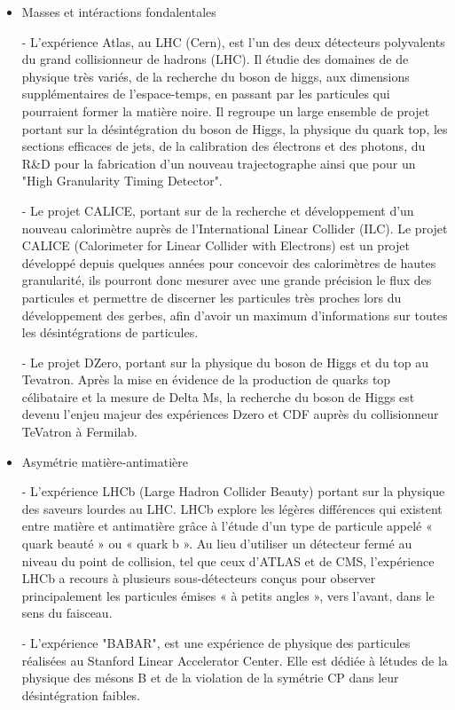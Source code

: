 \documentclass[french,a4paper,12pt]{report}
\begin{document}
  \begin{itemize}
		\item Masses et intéractions fondalentales
		
			- L'expérience Atlas, au LHC (Cern), est l'un des deux détecteurs polyvalents du grand collisionneur de hadrons (LHC). Il étudie des domaines de de physique très variés, de la recherche du boson de higgs, aux dimensions supplémentaires de l'espace-temps, en passant par les particules qui pourraient former la matière noire. Il regroupe un large ensemble de projet portant sur la désintégration du boson de Higgs, la physique du quark top, les sections efficaces de jets, de la calibration des électrons et des photons, du R\&D pour la fabrication d'un nouveau trajectographe ainsi que pour un "High Granularity Timing Detector".
			
			- Le projet CALICE, portant sur de la recherche et développement d'un nouveau calorimètre auprès de l'International Linear Collider (ILC). Le projet CALICE (Calorimeter for Linear Collider with Electrons) est un projet développé depuis quelques années pour concevoir des calorimètres de hautes granularité, ils pourront donc mesurer avec une grande précision le flux des particules et permettre de discerner les particules très proches lors du développement des gerbes, afin d'avoir un maximum d'informations sur toutes les désintégrations de particules.			
			
			- Le projet DZero, portant sur la physique du boson de Higgs et du top au Tevatron. Après la mise en évidence de la production de quarks top célibataire et la mesure de Delta Ms, la recherche du boson de Higgs est devenu l'enjeu majeur des expériences Dzero et CDF auprès du collisionneur TeVatron à Fermilab. 
			
		\item Asymétrie matière-antimatière
		
			- L'expérience LHCb (Large Hadron Collider Beauty) portant sur la physique des saveurs lourdes au LHC.
				LHCb explore les légères différences qui existent entre matière et antimatière grâce à l’étude d’un type de particule appelé « quark beauté » ou « quark b ». Au lieu d’utiliser un détecteur fermé au niveau du point de collision, tel que ceux d’ATLAS et de CMS, l’expérience LHCb a recours à plusieurs sous-détecteurs conçus pour observer principalement les particules émises « à petits angles », vers l’avant, dans le sens du faisceau.
			
			- L'expérience "BABAR", est une expérience de physique des particules réalisées au Stanford Linear Accelerator Center. Elle est dédiée à létudes de la physique des mésons B et de la violation de la symétrie CP dans leur désintégration faibles.
			

\end{itemize}
\end{document}
